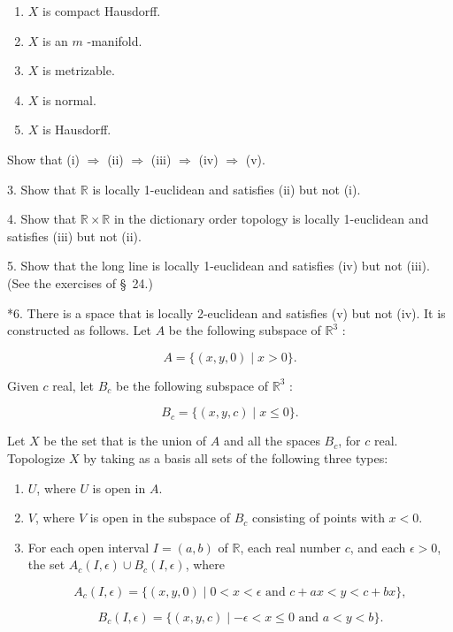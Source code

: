 \begin{enumerate}[itemsep=0.2em, parsep=0pt, topsep=0pt, partopsep=0pt, leftmargin=*, label=(\roman*), align=left]
\item \(X\) is compact Hausdorff.
\item \(X\) is an \(m\) -manifold.
\item \(X\) is metrizable.
\item \(X\) is normal.
\item \(X\) is Hausdorff.
\end{enumerate}

Show that (i) \(\Rightarrow\) (ii) \(\Rightarrow\) (iii) \(\Rightarrow\) (iv) \(\Rightarrow\) (v).

3. Show that \(\mathbb{R}\) is locally 1-euclidean and satisfies (ii) but not (i).

4. Show that \(\mathbb{R} \times \mathbb{R}\) in the dictionary order topology is locally 1-euclidean and satisfies (iii) but not (ii).

5. Show that the long line is locally 1-euclidean and satisfies (iv) but not (iii). (See the exercises of \S\ 24.)

*6. There is a space that is locally 2-euclidean and satisfies (v) but not (iv). It is constructed as follows. Let \(A\) be the following subspace of \(\mathbb{R}^{3}\) :

\[
A = \{ ({x,y,0}) \mid x > 0\}.
\]

Given \(c\) real, let \(B_{c}\) be the following subspace of \(\mathbb{R}^{3}\) :

\[
B_{c} = \{ ({x,y,c}) \mid x \leq 0\}.
\]

Let \(X\) be the set that is the union of \(A\) and all the spaces \(B_{c}\), for \(c\) real. Topologize \(X\) by taking as a basis all sets of the following three types:

\begin{enumerate}[itemsep=0.2em, parsep=0pt, topsep=0pt, partopsep=0pt, leftmargin=*, label=(\roman*), align=left]
\item \(U\), where \(U\) is open in \(A\).

\item \(V\), where \(V\) is open in the subspace of \(B_{c}\) consisting of points with \(x < 0\).

\item For each open interval \(I = ({a,b})\) of \(\mathbb{R}\), each real number \(c\), and each \(\epsilon > 0\), the set \(A_{c}({I,\epsilon }) \cup {B}_{c}({I,\epsilon })\), where

\[
A_{c}({I,\epsilon }) = \{ ({x,y,0}) \mid 0 < x < \epsilon \text{ and }c + {ax} < y < c + {bx}\},
\]

\[
B_{c}({I,\epsilon }) = \{ ({x,y,c}) \mid - \epsilon < x \leq 0\text{ and }a < y < b\}.
\]
\end{enumerate}

